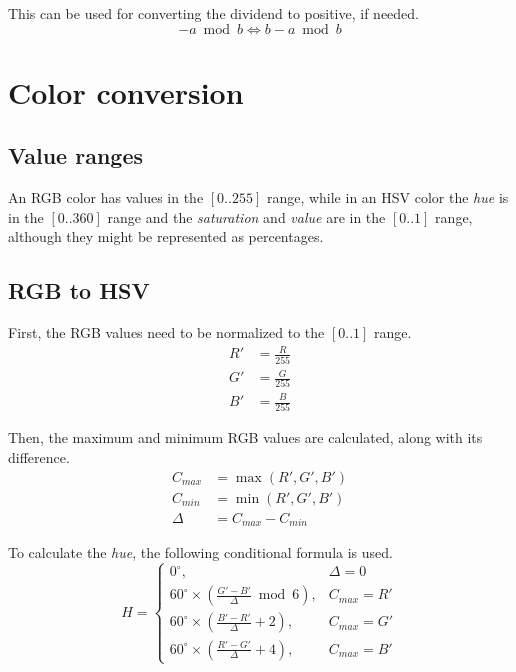 \documentclass{article}
\begin{document}
This can be used for converting the dividend to positive, if needed.
\begin{equation*}
  -a \bmod b \iff b - a \bmod b
\end{equation*}

\section{Color conversion}

\subsection{Value ranges}

An RGB color has values in the $[0..255]$ range, while in an HSV color the
\textit{hue} is in the $[0..360]$ range and the \textit{saturation} and
\textit{value} are in the $[0..1]$ range, although they might be represented as
percentages.

\subsection{RGB to HSV}

First, the RGB values need to be normalized to the $[0..1]$ range.
\begin{align*}
  R' &= \frac{R}{255} \\
  G' &= \frac{G}{255} \\
  B' &= \frac{B}{255}
\end{align*}

Then, the maximum and minimum RGB values are calculated, along with its
difference.
\begin{align*}
  C_{max} &= \max(R', G', B') \\
  C_{min} &= \min(R', G', B') \\
  \Delta  &= C_{max} - C_{min}
\end{align*}

To calculate the \textit{hue}, the following conditional formula is used.
\begin{equation*}
  H =
  \begin{cases}
    0^\circ,                                                    & \Delta = 0 \\
    60^\circ \times \left(\frac{G'-B'}{\Delta} \bmod 6 \right), & C_{max} = R' \\
    60^\circ \times \left(\frac{B'-R'}{\Delta} + 2 \right),     & C_{max} = G' \\
    60^\circ \times \left(\frac{R'-G'}{\Delta} + 4 \right),     & C_{max} = B'
  \end{cases}
\end{equation*}
\end{document}
